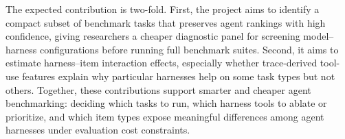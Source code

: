 \documentclass{article}
\begin{document}
The expected contribution is two-fold. First, the project aims to identify a compact subset of benchmark tasks that preserves agent rankings with high confidence, giving researchers a cheaper diagnostic panel for screening model--harness configurations before running full benchmark suites. Second, it aims to estimate harness--item interaction effects, especially whether trace-derived tool-use features explain why particular harnesses help on some task types but not others. Together, these contributions support smarter and cheaper agent benchmarking: deciding which tasks to run, which harness tools to ablate or prioritize, and which item types expose meaningful differences among agent harnesses under evaluation cost constraints.



\end{document}
